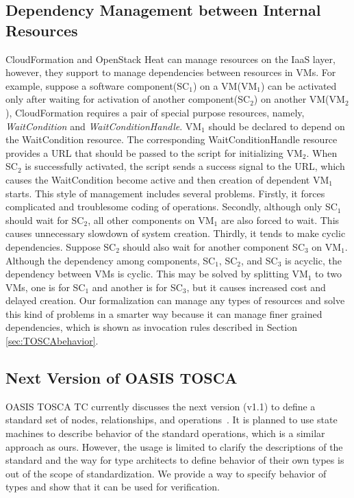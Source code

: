 \documentclass[12pt]{report}
\begin{document}
\subsection{Dependency Management between Internal Resources}
CloudFormation and OpenStack Heat can manage resources on the IaaS
layer, however, they support to manage dependencies between resources
in VMs. For example, suppose a software component(SC$_1$) on a
VM(VM$_1$) can be activated only after waiting for activation of
another component(SC$_2$) on another VM(VM$_2$), CloudFormation
requires a pair of special purpose resources, namely, {\it
  WaitCondition} and {\it WaitConditionHandle}. VM$_1$ should be
declared to depend on the WaitCondition resource. The corresponding
WaitConditionHandle resource provides a URL that should be passed to
the script for initializing VM$_2$. When SC$_2$ is successfully
activated, the script sends a success signal to the URL, which causes
the WaitCondition become active and then creation of dependent VM$_1$
starts. This style of management includes several problems. Firstly,
it forces complicated and troublesome coding of operations.  Secondly,
although only SC$_1$ should wait for SC$_2$, all other components on
VM$_1$ are also forced to wait. This causes unnecessary slowdown of
system creation. Thirdly, it tends to make cyclic
dependencies. Suppose SC$_2$ should also wait for another component
SC$_3$ on VM$_1$. Although the dependency among components, SC$_1$,
SC$_2$, and SC$_3$ is acyclic, the dependency between VMs is
cyclic. This may be solved by splitting VM$_1$ to two VMs, one is for
SC$_1$ and another is for SC$_3$, but it causes increased cost and
delayed creation. Our formalization can manage any types of resources
and solve this kind of problems in a smarter way because it can manage
finer grained dependencies, which is shown as invocation rules
described in Section \ref{sec:TOSCAbehavior}.

\subsection{Next Version of OASIS TOSCA}
OASIS TOSCA TC currently discusses the next version (v1.1) to define a
standard set of nodes, relationships, and
operations~\cite{TOSCAYAML}. It is planned to use state machines to
describe behavior of the standard operations, which is a similar
approach as ours. However, the usage is limited to clarify the
descriptions of the standard and the way for type architects to define
behavior of their own types is out of the scope of standardization. We
provide a way to specify behavior of types and show that it can be
used for verification.
\end{document}
